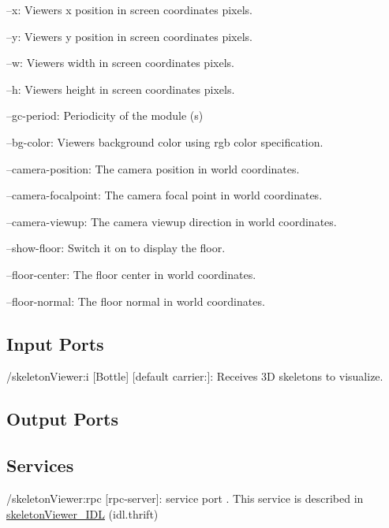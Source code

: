 \begin{DoxyItemize}
\item --x\+: Viewer\textquotesingle{}s x position in screen coordinates pixels.
\item --y\+: Viewer\textquotesingle{}s y position in screen coordinates pixels.
\item --w\+: Viewer\textquotesingle{}s width in screen coordinates pixels.
\item --h\+: Viewer\textquotesingle{}s height in screen coordinates pixels.
\item --gc-\/period\+: Periodicity of the module (s)
\item --bg-\/color\+: Viewer\textquotesingle{}s background color using rgb color specification.
\item --camera-\/position\+: The camera position in world coordinates.
\item --camera-\/focalpoint\+: The camera focal point in world coordinates.
\item --camera-\/viewup\+: The camera viewup direction in world coordinates.
\item --show-\/floor\+: Switch it on to display the floor.
\item --floor-\/center\+: The floor center in world coordinates.
\item --floor-\/normal\+: The floor normal in world coordinates. 
\end{DoxyItemize}\hypertarget{group__skeletonViewer_inputports_sec}{}\subsection{Input Ports}\label{group__skeletonViewer_inputports_sec}

\begin{DoxyItemize}
\item /skeleton\+Viewer\+:i \mbox{[}Bottle\mbox{]} \mbox{[}default carrier\+:\mbox{]}\+: Receives 3D skeletons to visualize.
\end{DoxyItemize}\hypertarget{group__skeletonViewer_outputports_sec}{}\subsection{Output Ports}\label{group__skeletonViewer_outputports_sec}
\hypertarget{group__skeletonViewer_services_sec}{}\subsection{Services}\label{group__skeletonViewer_services_sec}

\begin{DoxyItemize}
\item /skeleton\+Viewer\+:rpc \mbox{[}rpc-\/server\mbox{]}\+: service port . This service is described in \hyperlink{classskeletonViewer__IDL}{skeleton\+Viewer\+\_\+\+I\+DL} (idl.\+thrift) 
\end{DoxyItemize}